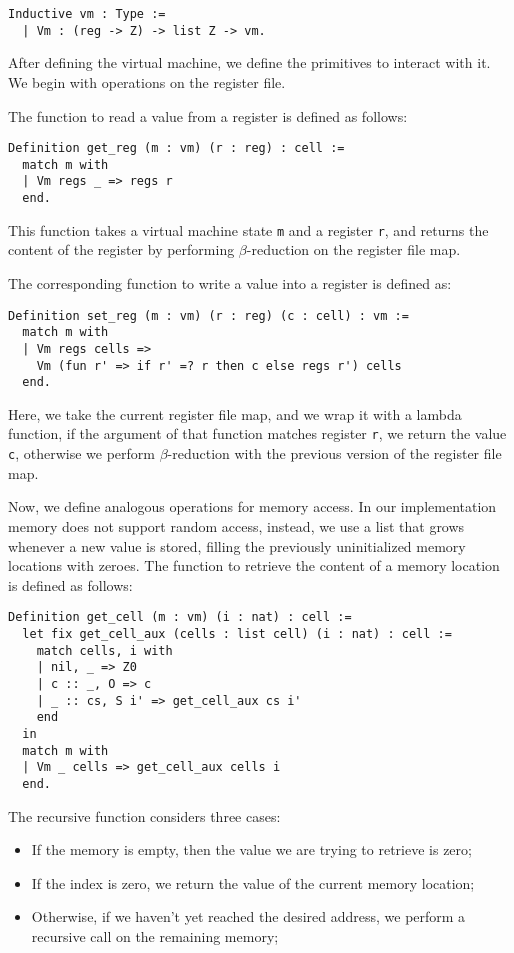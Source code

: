 \begin{lstlisting}[style=Rocq]
Inductive vm : Type :=
  | Vm : (reg -> Z) -> list Z -> vm.
\end{lstlisting}

After defining the virtual machine, we define the primitives to interact with it. We begin with operations on the register file.

The function to read a value from a register is defined as follows:

\begin{lstlisting}[style=Rocq]
Definition get_reg (m : vm) (r : reg) : cell :=
  match m with
  | Vm regs _ => regs r
  end.
\end{lstlisting}

This function takes a virtual machine state \texttt m and a register \texttt r, and returns the content of the register  by performing $\beta$-reduction on the register file map.

The corresponding function to write a value into a register is defined as:

\begin{lstlisting}[style=Rocq]
Definition set_reg (m : vm) (r : reg) (c : cell) : vm :=
  match m with
  | Vm regs cells =>
    Vm (fun r' => if r' =? r then c else regs r') cells
  end.
\end{lstlisting}

Here, we take the current register file map, and we wrap it with a lambda function, if the argument of that function matches register \texttt r, we return the value \texttt c, otherwise we perform $\beta$-reduction with the previous version of the register file map.

Now, we define analogous operations for memory access. In our implementation memory does not support random access, instead, we use a list that grows whenever a new value is stored, filling the previously uninitialized memory locations with zeroes. The function to retrieve the content of a memory location is defined as follows:

\begin{lstlisting}[style=Rocq]
Definition get_cell (m : vm) (i : nat) : cell :=
  let fix get_cell_aux (cells : list cell) (i : nat) : cell :=
    match cells, i with
    | nil, _ => Z0
    | c :: _, O => c
    | _ :: cs, S i' => get_cell_aux cs i'
    end
  in
  match m with
  | Vm _ cells => get_cell_aux cells i
  end.
\end{lstlisting}

The recursive function considers three cases:
\begin{itemize}
  \item If the memory is empty, then the value we are trying to retrieve is zero;
  \item If the index is zero, we return the value of the current memory location;
  \item Otherwise, if we haven't yet reached the desired address, we perform a recursive call on the remaining memory;
\end{itemize}


